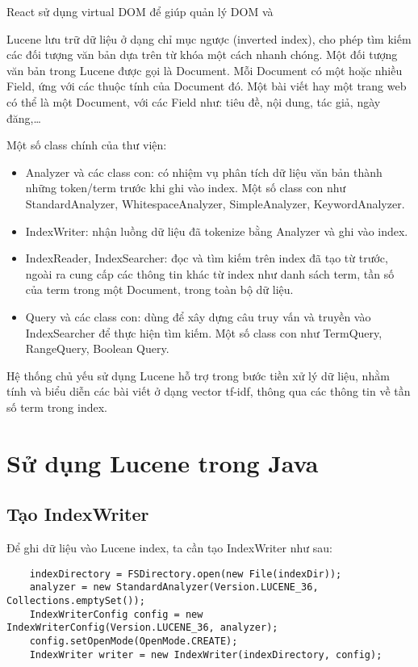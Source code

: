 React sử dụng virtual DOM để giúp quản lý DOM và 

Lucene lưu trữ dữ liệu ở dạng chỉ mục ngược (inverted index), cho phép tìm kiếm các đối tượng văn bản dựa trên từ khóa một cách nhanh chóng. Một đối tượng văn bản trong Lucene được gọi là Document. Mỗi Document có một hoặc nhiều Field, ứng với các thuộc tính của Document đó. Một bài viết hay một trang web có thể là một Document, với các Field như: tiêu đề, nội dung, tác giả, ngày đăng,…

Một số class chính của thư viện:
\begin{itemize}
	\item Analyzer và các class con: có nhiệm vụ phân tích dữ liệu văn bản thành những token/term trước khi ghi vào index. Một số class con như StandardAnalyzer, WhitespaceAnalyzer, SimpleAnalyzer, KeywordAnalyzer.
	\item IndexWriter: nhận luồng dữ liệu đã tokenize bằng Analyzer và ghi vào index.
	\item IndexReader, IndexSearcher: đọc và tìm kiếm trên index đã tạo từ trước, ngoài ra cung cấp các thông tin khác từ index như danh sách term, tần số của term trong một Document, trong toàn bộ dữ liệu.
	\item Query và các class con: dùng để xây dựng câu truy vấn và truyền vào IndexSearcher để thực hiện tìm kiếm. Một số class con như TermQuery, RangeQuery, Boolean Query. 
\end{itemize}

Hệ thống chủ yếu sử dụng Lucene hỗ trợ trong bước tiền xử lý dữ liệu, nhằm tính và biểu diễn các bài viết ở dạng vector tf-idf, thông qua các thông tin về tần số term trong index.

\section*{Sử dụng Lucene trong Java}
	\subsection*{Tạo IndexWriter}
	Để ghi dữ liệu vào Lucene index, ta cần tạo IndexWriter như sau:
		\begin{lstlisting}
	indexDirectory = FSDirectory.open(new File(indexDir)); 
	analyzer = new StandardAnalyzer(Version.LUCENE_36, Collections.emptySet());
	IndexWriterConfig config = new IndexWriterConfig(Version.LUCENE_36, analyzer);
	config.setOpenMode(OpenMode.CREATE);
	IndexWriter writer = new IndexWriter(indexDirectory, config);
		\end{lstlisting}
